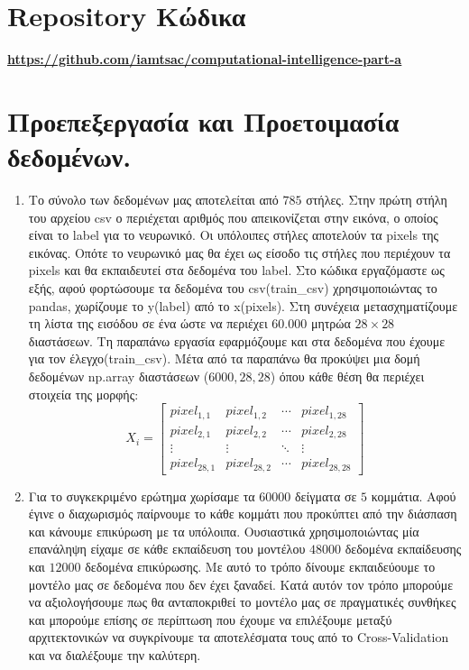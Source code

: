 \documentclass[12pt,a4paper]{article}
\author{Κωνσταντίνος Τσάκωνας \\ Α.Μ.: 1059666}
\date{Ακαδημαϊκό έτος 2020-21\\ Χειμερινό Εξάμηνο}
\newcommand{\tl}{\textlatin}
\newcommand{\gr}{\selectlanguage{greek}}
\begin{document}
    \gr \maketitle \newpage

    \tableofcontents  \newpage

    \section*{\tl{Repository} \gr Κώδικα}
        \underline{\tl{\textbf{\url{https://github.com/iamtsac/computational-intelligence-part-a}}}}

    \section{Προεπεξεργασία και Προετοιμασία δεδομένων.} 
    \begin{enumerate}
        \item 
        Το σύνολο των δεδομένων μας αποτελείται από $785$ στήλες. Στην πρώτη στήλη του αρχείου \tl{csv} ο περιέχεται αριθμός που απεικονίζεται στην εικόνα, ο οποίος είναι το  \tl{label} για το νευρωνικό. Οι υπόλοιπες στήλες αποτελούν τα \tl{pixels} της εικόνας. Οπότε το νευρωνικό μας θα έχει ως είσοδο τις στήλες που περιέχουν τα \tl{pixels} και θα εκπαιδευτεί στα δεδομένα του \tl{label}. Στο κώδικα εργαζόμαστε ως εξής, αφού φορτώσουμε τα δεδομένα του \tl{csv(train\_csv)} χρησιμοποιώντας το pandas, χωρίζουμε το \tl{y(label)} από το \tl{x(pixels)}. Στη συνέχεια μετασχηματίζουμε τη λίστα της εισόδου σε ένα ώστε να περιέχει $60.000$ μητρώα $28\times28$ διαστάσεων. Τη παραπάνω εργασία εφαρμόζουμε και στα δεδομένα που έχουμε για τον έλεγχο(\tl{train\_csv}). Μέτα από τα παραπάνω θα προκύψει μια δομή δεδομένων \tl{np.array} διαστάσεων ($6000,28,28$) όπου κάθε θέση θα περιέχει στοιχεία της μορφής:
        \begin{equation*}
        X_i = 
        \begin{bmatrix}
            pixel_{1,1} & pixel_{1,2} & \cdots & pixel_{1,28} \\
            pixel_{2,1} & pixel_{2,2} & \cdots & pixel_{2,28} \\
            \vdots      & \vdots      & \ddots & \vdots  \\
            pixel_{28,1} & pixel_{28,2} & \cdots & pixel_{28,28} 
        \end{bmatrix} 
        \end{equation*}
        \item Για το συγκεκριμένο ερώτημα χωρίσαμε τα $60000$ δείγματα σε $5$ κομμάτια. Αφού έγινε ο διαχωρισμός παίρνουμε το κάθε κομμάτι που προκύπτει από την διάσπαση και κάνουμε επικύρωση με τα υπόλοιπα. Ουσιαστικά χρησιμοποιώντας μία επανάληψη είχαμε σε κάθε εκπαίδευση του μοντέλου $48000$ δεδομένα εκπαίδευσης και $12000$ δεδομένα επικύρωσης. Με αυτό το τρόπο δίνουμε εκπαιδεύουμε το μοντέλο μας σε δεδομένα που δεν έχει ξαναδεί. Κατά αυτόν τον τρόπο μπορούμε να αξιολογήσουμε πως θα ανταποκριθεί το μοντέλο μας σε πραγματικές συνθήκες και μπορούμε επίσης σε περίπτωση που έχουμε να επιλέξουμε μεταξύ αρχιτεκτονικών να συγκρίνουμε τα αποτελέσματα τους από το \tl{Cross-Validation } και να διαλέξουμε την καλύτερη.
    \end{enumerate}
\end{document}
